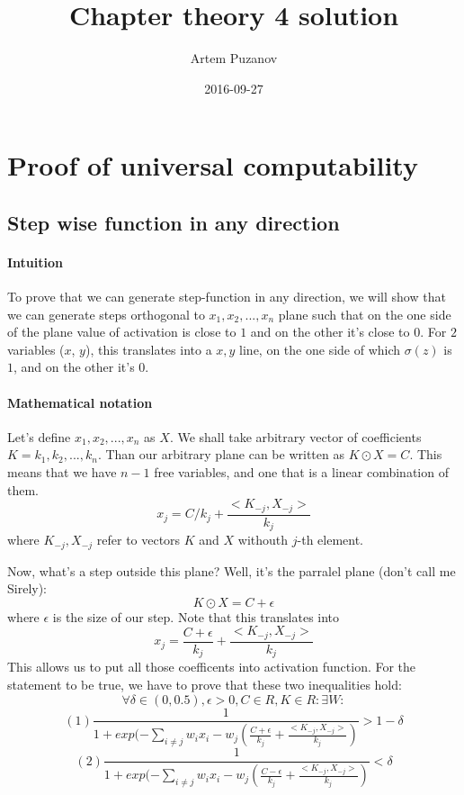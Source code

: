\documentclass{article}
\title{Chapter theory 4 solution}
\date{2016-09-27}
\author{Artem Puzanov}
\begin{document}
\maketitle
{}
\newpage
{}


\section{Proof of universal computability}
\subsection{Step wise function in any direction}

\paragraph{Intuition}
To prove that we can generate step-function in any direction, we will show that we can
generate steps orthogonal to ${x_1, x_2, ..., x_n}$ plane such that on the one side of the plane value of activation is close to $1$
and on the other it's close to $0$. For $2$ variables ($x$, $y$), this translates into a ${x, y}$ line, on the one side of which $\sigma(z)$
is $1$, and on the other it's $0$.
\paragraph{Mathematical notation}
Let's define ${x_1, x_2, ..., x_n}$ as $X$. We shall take arbitrary vector of coefficients $K = {k_1, k_2, ..., k_n}$.
Than our arbitrary plane can be written as $K \odot X = C$. This means that we have $n-1$ free variables, and one that is a linear combination of them.
$$x_j = C/k_j + \frac{<K_{-j} , X_{-j}>}{k_j}$$
where $K_{-j} , X_{-j}$ refer to vectors $K$ and $X$ withouth $j$-th element.

Now, what's a step outside this plane?
Well, it's the parralel plane (don't call me Sirely):
$$K \odot X = C + \epsilon$$
where $\epsilon$ is the size of our step.
Note that this translates into
$$x_j = \frac{C + \epsilon}{k_j} + \frac{<K_{-j} , X_{-j}>}{k_j}$$
This allows us to put all those coefficents into activation function.
For the statement to be true, we have to prove that these two inequalities hold:
$$\forall \delta \in (0, 0.5), \epsilon > 0 , C \in R,  K \in R: \exists W:$$
$$(1) \frac{1}{1 + exp(- \sum_{i \neq j}w_ix_i - w_j (\frac{C + \epsilon}{k_j} + \frac{<K_{-j} , X_{-j}>}{k_j})} > 1-\delta$$
$$(2) \frac{1}{1 + exp(- \sum_{i \neq j}w_ix_i - w_j (\frac{C - \epsilon}{k_j} + \frac{<K_{-j} , X_{-j}>}{k_j})} < \delta$$
\end{document}
